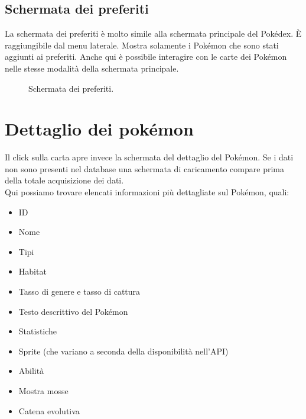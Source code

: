 \documentclass[a4paper,11pt]{article}
\begin{document}
\subsection{Schermata dei preferiti}
La schermata dei preferiti è molto simile alla schermata principale del Pokédex. È raggiungibile dal menu laterale. Mostra solamente i Pokémon che sono stati aggiunti ai preferiti. Anche qui è possibile interagire con le carte dei Pokémon nelle stesse modalità della schermata principale.
  \begin{figure}[h!]
    \centering
{}
  \caption{Schermata dei preferiti.}
\end{figure}
\newpage

\section{Dettaglio dei pokémon}
  Il click sulla carta apre invece la schermata del dettaglio del Pokémon. Se i dati non sono presenti nel database una schermata di caricamento compare prima della totale acquisizione dei dati.\\Qui possiamo trovare elencati informazioni più dettagliate sul Pokémon, quali:
\begin{itemize}
\item ID
\item Nome
\item Tipi
\item Habitat
\item Tasso di genere e tasso di cattura
\item Testo descrittivo del Pokémon
\item Statistiche
\item Sprite (che variano a seconda della disponibilità nell’API)
\item Abilità
\item Mostra mosse
\item Catena evolutiva
\end{itemize}
\end{document}
